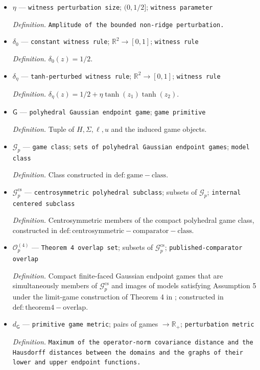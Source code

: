 \documentclass{article}
\begin{document}
\begin{itemize}
  \item \(\eta\) --- \texttt{witness perturbation size}; \((0,1/2]\); \texttt{witness parameter}
  \par\smallskip\noindent\emph{Definition.} \texttt{Amplitude of the bounded non-\allowbreak{}ridge perturbation.}
  \item \(\delta_0\) --- \texttt{constant witness rule}; \(\mathbb R^2\to[0,1]\); \texttt{witness rule}
  \par\smallskip\noindent\emph{Definition.} \(\delta_0(z)=1/2\).
  \item \(\delta_{\eta}\) --- \texttt{tanh-\allowbreak{}perturbed witness rule}; \(\mathbb R^2\to[0,1]\); \texttt{witness rule}
  \par\smallskip\noindent\emph{Definition.} \(\delta_{\eta}(z)=1/2+\eta\tanh(z_1)\tanh(z_2)\).
  \item \(\mathsf G\) --- \texttt{polyhedral Gaussian endpoint game}; \texttt{game primitive}
  \par\smallskip\noindent\emph{Definition.} Tuple of \(H,\Sigma,\ell,u\) and the induced game objects.
  \item \(\mathcal G_p\) --- \texttt{game class}; \texttt{sets of polyhedral Gaussian endpoint games}; \texttt{model class}
  \par\smallskip\noindent\emph{Definition.} Class constructed in \(\mathrm{def:game-class}\).
  \item \(\mathcal G_p^{\mathrm{cs}}\) --- \texttt{centrosymmetric polyhedral subclass}; subsets of \(\mathcal G_p\); \texttt{internal centered subclass}
  \par\smallskip\noindent\emph{Definition.} Centrosymmetric members of the compact polyhedral game class, constructed in \(\mathrm{def:centrosymmetric-comparator-class}\).
  \item \(\mathcal O_p^{(4)}\) --- \texttt{Theorem 4 overlap set}; subsets of \(\mathcal G_p^{\mathrm{cs}}\); \texttt{published-\allowbreak{}comparator overlap}
  \par\smallskip\noindent\emph{Definition.} Compact finite-faced Gaussian endpoint games that are simultaneously members of \(\mathcal G_p^{\mathrm{cs}}\) and images of models satisfying Assumption 5 under the limit-game construction of Theorem 4 in \cite{MontielOleaQiuStoye2026Local}; constructed in \(\mathrm{def:theorem4-overlap}\).
  \item \(d_{\mathsf G}\) --- \texttt{primitive game metric}; pairs of games \(\to\mathbb R_{+}\); \texttt{perturbation metric}
  \par\smallskip\noindent\emph{Definition.} \texttt{Maximum of the operator-\allowbreak{}norm covariance distance and the Hausdorff distances between the domains and the graphs of their lower and upper endpoint functions.}

\end{itemize}
\end{document}
